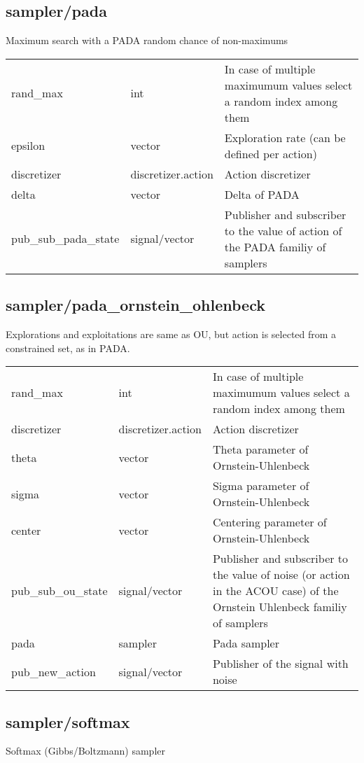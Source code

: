 \subsection{sampler/pada}
\noindent Maximum search with a PADA random chance of non-maximums\\

\noindent\begin{tabular}{@{}lll@{}}
rand\_max&int&In case of multiple maximumum values select a random index among them\\
epsilon&vector&Exploration rate (can be defined per action)\\
discretizer&discretizer.action&Action discretizer\\
delta&vector&Delta of PADA\\
pub\_sub\_pada\_state&signal/vector&Publisher and subscriber to the value of action of the PADA familiy of samplers\\
\end{tabular}
\subsection{sampler/pada\_ornstein\_ohlenbeck}
\noindent Explorations and exploitations are same as OU, but action is selected from a constrained set, as in PADA. \\

\noindent\begin{tabular}{@{}lll@{}}
rand\_max&int&In case of multiple maximumum values select a random index among them\\
discretizer&discretizer.action&Action discretizer\\
theta&vector&Theta parameter of Ornstein-Uhlenbeck\\
sigma&vector&Sigma parameter of Ornstein-Uhlenbeck\\
center&vector&Centering parameter of Ornstein-Uhlenbeck\\
pub\_sub\_ou\_state&signal/vector&Publisher and subscriber to the value of noise (or action in the ACOU case) of the Ornstein Uhlenbeck familiy of samplers\\
pada&sampler&Pada sampler\\
pub\_new\_action&signal/vector&Publisher of the signal with noise\\
\end{tabular}
\subsection{sampler/softmax}
\noindent Softmax (Gibbs/Boltzmann) sampler\\

